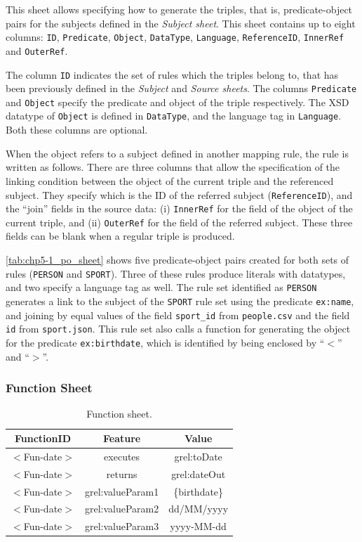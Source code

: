 This sheet allows specifying how to generate the triples, that is, predicate-object pairs for the subjects defined in the \textit{Subject sheet}. This sheet contains up to eight columns: \texttt{ID}, \texttt{Predicate}, \texttt{Object}, \texttt{DataType}, \texttt{Language}, \texttt{ReferenceID}, \texttt{InnerRef} and \texttt{OuterRef}.

The column \texttt{ID} indicates the set of rules which the triples belong to, that has been previously defined in the \textit{Subject} and \textit{Source sheets}.
The columns \texttt{Predicate} and \texttt{Object} specify the predicate and object of the triple respectively. 
The XSD datatype of \texttt{Object} is defined in \texttt{DataType}, and the language tag in \texttt{Language}. Both these columns are optional. 

When the object refers to a subject defined in another mapping rule, the rule is written as follows. 
There are three columns that allow the specification of the linking condition between the object of the current triple and the referenced subject. 
They specify which is the ID of the referred subject  (\texttt{ReferenceID}), and the ``join'' fields in the source data: (i) \texttt{InnerRef} for the field of the object of the current triple, and (ii) \texttt{OuterRef} for the field of the referred subject. These three fields can be blank when a regular triple is produced. 

\cref{tab:chp5-1_po_sheet} shows five predicate-object pairs created for both sets of rules (\texttt{PERSON} and \texttt{SPORT}). Three of these rules produce literals with datatypes, and two specify a language tag as well. The rule set identified as \texttt{PERSON} generates a link to the subject of the \texttt{SPORT} rule set using the predicate \texttt{ex:name}, and joining by equal values of the field \texttt{sport\_id} from \texttt{people.csv} and the field \texttt{id} from \texttt{sport.json}. This rule set also calls a function for generating the object for the predicate \texttt{ex:birthdate}, which is identified by being enclosed by ``$<$'' and ``$>$''.

\subsubsection{Function Sheet}
\hspace{0.1cm}

\begin{table}[h]
\caption{Function sheet.}
\label{tab:chp5-1_function_sheet}
\centering
\begin{tabular}{c|c|c}
\midrule
\textbf{FunctionID} & \textbf{Feature} & \textbf{Value} \\ \midrule
$<$Fun-date$>$ & executes & grel:toDate \\  
$<$Fun-date$>$ & returns & grel:dateOut \\  
$<$Fun-date$>$ & grel:valueParam1 & \{birthdate\} \\
$<$Fun-date$>$ & grel:valueParam2 & dd/MM/yyyy \\
$<$Fun-date$>$ & grel:valueParam3 & yyyy-MM-dd \\
\midrule
\end{tabular}
\end{table}


